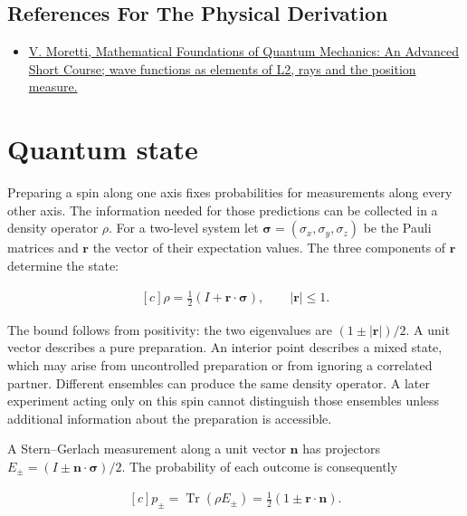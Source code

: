 \documentclass[11pt,oneside]{book}
\newenvironment{centeredalign}{\[\begin{gathered}[c]}{\end{gathered}\]}
\begin{document}
\subsection*{References For The Physical Derivation}
\begin{itemize}
\item \href{https://arxiv.org/abs/1508.06951}{V. Moretti, Mathematical Foundations of Quantum Mechanics: An Advanced Short Course; wave functions as elements of L2, rays and the position measure.}
\end{itemize}





\clearpage

\section{Quantum state}

\label{topic:quantum-state}

Preparing a spin along one axis fixes probabilities for measurements along every other axis. The information needed for those predictions can be collected in a density operator \(\rho\). For a two-level system let \(\boldsymbol\sigma=(\sigma_x,\sigma_y,\sigma_z)\) be the Pauli matrices and \(\mathbf r\) the vector of their expectation values. The three components of \(\mathbf r\) determine the state:

\begin{centeredalign}
\rho=\frac12(I+\mathbf r\cdot\boldsymbol\sigma),\qquad |\mathbf r|\leq1.
\end{centeredalign}

The bound follows from positivity: the two eigenvalues are \((1\pm|\mathbf r|)/2\). A unit vector describes a pure preparation. An interior point describes a mixed state, which may arise from uncontrolled preparation or from ignoring a correlated partner. Different ensembles can produce the same density operator. A later experiment acting only on this spin cannot distinguish those ensembles unless additional information about the preparation is accessible.

A Stern--Gerlach measurement along a unit vector \(\mathbf n\) has projectors \(E_\pm=(I\pm\mathbf n\cdot\boldsymbol\sigma)/2\). The probability of each outcome is consequently

\begin{centeredalign}
p_\pm=\operatorname{Tr}(\rho E_\pm)=\frac12(1\pm\mathbf r\cdot\mathbf n).
\end{centeredalign}
\end{document}
